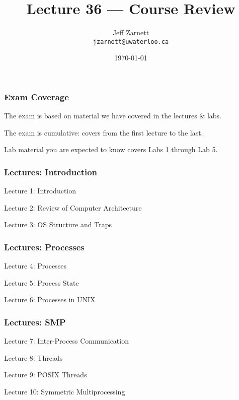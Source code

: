 

\title{Lecture 36 --- Course Review }

\author{Jeff Zarnett \\ \small \texttt{jzarnett@uwaterloo.ca}}
\date{\today}




\begin{frame}
  \titlepage

 \end{frame}


\begin{frame}
\frametitle{Exam Coverage}

The exam is based on material we have covered in the lectures \& labs.

The exam is cumulative: covers from the first lecture to the last.

Lab material you are expected to know covers Labs 1 through Lab 5.

\end{frame}

\begin{frame}
\frametitle{Lectures: Introduction}

{\LARGE
Lecture 1: Introduction

Lecture 2: Review of Computer Architecture

Lecture 3: OS Structure and Traps
}

\end{frame}

\begin{frame}
\frametitle{Lectures: Processes}

{\LARGE
Lecture 4: Processes

Lecture 5: Process State

Lecture 6: Processes in UNIX
}

\end{frame}

\begin{frame}
\frametitle{Lectures: SMP}

{\LARGE
Lecture 7: Inter-Process Communication

Lecture 8: Threads

Lecture 9: POSIX Threads

Lecture 10: Symmetric Multiprocessing
}

\end{frame}

